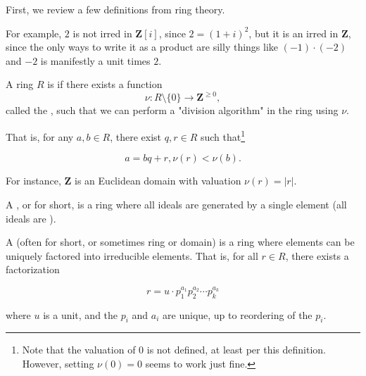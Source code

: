 First, we review a few definitions from ring theory.



For example, \(2\) is not irred in \({\mathbf Z}[i]\), since \(2={(1+i)}^2\),
but it is an irred in \({\mathbf Z}\), since the only ways to write it as a
product are silly things like \((-1)\cdot (-2)\) and \(-2\) is manifestly a unit
times \(2\).

\begin{definition}
  A ring \(R\) is  if there exists a function \[\nu :
    R\setminus\{0\}\to{\mathbf Z} ^ {\geq 0},\] called the , such that we can perform a "division algorithm" in the ring
  using \(\nu\).
\end{definition}
That is, for any \(a, b\in R\), there exist \(q, r\in R\) such
that\footnote{Note that the valuation of \(0\) is not defined, at least per this
  definition. However, setting \(\nu(0)=0\) seems to work just fine.}


\[a=bq+r, \nu(r) < \nu(b).\]

For instance, \({\mathbf Z}\) is an Euclidean domain with valuation \(\nu(r) =
|r|\).

\begin{definition}
  A , or  for short, is a ring
  where all ideals are generated by a single element (all ideals are
  ).
\end{definition}

\begin{definition}
  A  (often  for short, or
  sometimes  ring or domain) is a ring where elements can be
  uniquely factored into irreducible elements. That is, for all \(r\in R\),
  there exists a factorization

  \[ r=u\cdot p_1 ^ {a_1}p_2 ^ {a_2}\cdots p_k ^ {a_k} \]

  where \(u\) is a unit, and the \(p_i\) and \(a_i\) are unique, up to
  reordering of the \(p_i\).
\end{definition}

